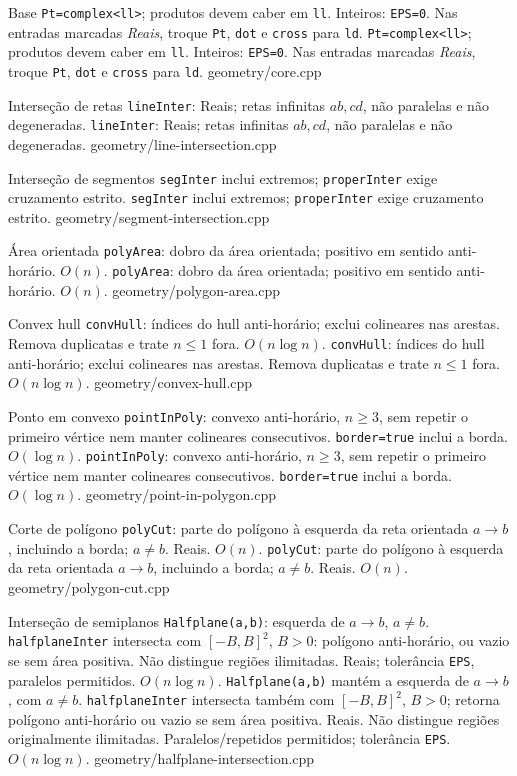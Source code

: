 \templateentry
{Base}
{\texttt{Pt=complex<ll>}; produtos devem caber em \texttt{ll}. Inteiros: \texttt{EPS=0}. Nas entradas marcadas \emph{Reais}, troque \texttt{Pt}, \texttt{dot} e \texttt{cross} para \texttt{ld}.}
{\texttt{Pt=complex<ll>}; produtos devem caber em \texttt{ll}. Inteiros: \texttt{EPS=0}. Nas entradas marcadas \emph{Reais}, troque \texttt{Pt}, \texttt{dot} e \texttt{cross} para \texttt{ld}.}
{geometry/core.cpp}

\templateentry
{Interseção de retas}
{\texttt{lineInter}: Reais; retas infinitas $ab,cd$, não paralelas e não degeneradas.}
{\texttt{lineInter}: Reais; retas infinitas $ab,cd$, não paralelas e não degeneradas.}
{geometry/line-intersection.cpp}

\templateentry
{Interseção de segmentos}
{\texttt{segInter} inclui extremos; \texttt{properInter} exige cruzamento estrito.}
{\texttt{segInter} inclui extremos; \texttt{properInter} exige cruzamento estrito.}
{geometry/segment-intersection.cpp}

\templateentry
{Área orientada}
{\texttt{polyArea}: dobro da área orientada; positivo em sentido anti-horário. $O(n)$.}
{\texttt{polyArea}: dobro da área orientada; positivo em sentido anti-horário. $O(n)$.}
{geometry/polygon-area.cpp}

\templateentry
{Convex hull}
{\texttt{convHull}: índices do hull anti-horário; exclui colineares nas arestas. Remova duplicatas e trate $n\le1$ fora. $O(n\log n)$.}
{\texttt{convHull}: índices do hull anti-horário; exclui colineares nas arestas. Remova duplicatas e trate $n\le1$ fora. $O(n\log n)$.}
{geometry/convex-hull.cpp}

\templateentry
{Ponto em convexo}
{\texttt{pointInPoly}: convexo anti-horário, $n\ge3$, sem repetir o primeiro vértice nem manter colineares consecutivos. \texttt{border=true} inclui a borda. $O(\log n)$.}
{\texttt{pointInPoly}: convexo anti-horário, $n\ge3$, sem repetir o primeiro vértice nem manter colineares consecutivos. \texttt{border=true} inclui a borda. $O(\log n)$.}
{geometry/point-in-polygon.cpp}

\templateentry
{Corte de polígono}
{\texttt{polyCut}: parte do polígono à esquerda da reta orientada $a\to b$, incluindo a borda; $a\ne b$. Reais. $O(n)$.}
{\texttt{polyCut}: parte do polígono à esquerda da reta orientada $a\to b$, incluindo a borda; $a\ne b$. Reais. $O(n)$.}
{geometry/polygon-cut.cpp}

\templateentry
{Interseção de semiplanos}
{\texttt{Halfplane(a,b)}: esquerda de $a\to b$, $a\ne b$. \texttt{halfplaneInter} intersecta com $[-B,B]^2$, $B>0$: polígono anti-horário, ou vazio se sem área positiva. Não distingue regiões ilimitadas. Reais; tolerância \texttt{EPS}, paralelos permitidos. $O(n\log n)$.}
{\texttt{Halfplane(a,b)} mantém a esquerda de $a\to b$, com $a\ne b$. \texttt{halfplaneInter} intersecta também com $[-B,B]^2$, $B>0$; retorna polígono anti-horário ou vazio se sem área positiva. Reais. Não distingue regiões originalmente ilimitadas. Paralelos/repetidos permitidos; tolerância \texttt{EPS}. $O(n\log n)$.}
{geometry/halfplane-intersection.cpp}

